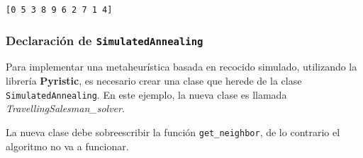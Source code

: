 \documentclass[11pt]{article}
\begin{document}
    \begin{Verbatim}[commandchars=\\\{\}]
[0 5 3 8 9 6 2 7 1 4]

    \end{Verbatim}

    \subsubsection{\texorpdfstring{Declaración de
\texttt{SimulatedAnnealing}}{Declaración de SimulatedAnnealing}}\label{declaraciuxf3n-de-simulatedannealing}

Para implementar una metaheurística basada en recocido simulado,
utilizando la librería \textbf{Pyristic}, es necesario crear una clase
que herede de la clase \texttt{SimulatedAnnealing}. En este ejemplo, la
nueva clase es llamada \emph{TravellingSalesman\_solver}.

La nueva clase debe sobreescribir la función \texttt{get\_neighbor}, de
lo contrario el algoritmo no va a funcionar.
\end{document}
